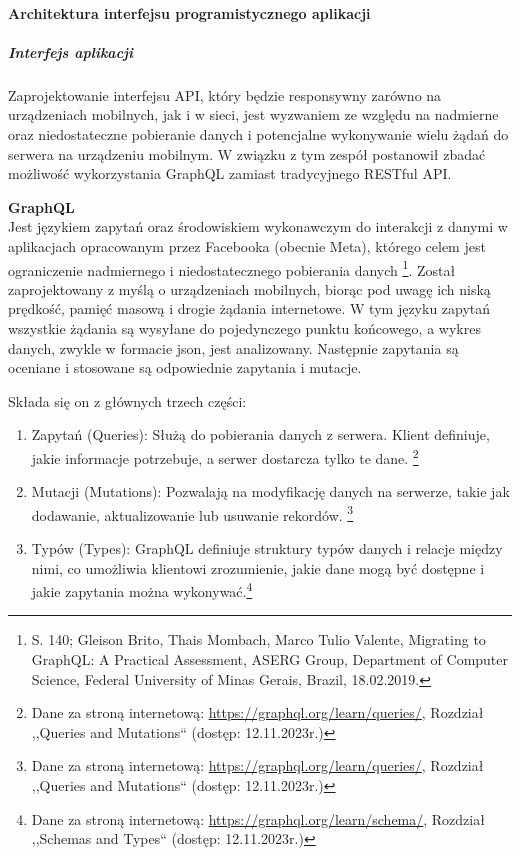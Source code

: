 \documentclass[12pt, a4paper, twoside, openany]{book}
\begin{document}
\paragraph{Architektura interfejsu programistycznego aplikacji}
\subparagraph{Interfejs aplikacji\\}
Zaprojektowanie interfejsu API, który będzie responsywny zarówno na urządzeniach mobilnych, jak i w sieci, jest wyzwaniem ze względu na nadmierne oraz niedostateczne pobieranie danych i potencjalne wykonywanie wielu żądań do serwera na urządzeniu mobilnym.
W związku z tym zespół postanowił zbadać możliwość wykorzystania GraphQL zamiast tradycyjnego RESTful API.

\textbf{GraphQL}\\
Jest językiem zapytań oraz środowiskiem wykonawczym do interakcji z danymi w aplikacjach opracowanym przez Facebooka (obecnie Meta), którego celem jest ograniczenie nadmiernego i niedostatecznego pobierania danych \footnote{S. 140; Gleison Brito, Thais Mombach, Marco Tulio Valente, Migrating to GraphQL: A Practical Assessment, ASERG Group, Department of Computer Science, Federal University of Minas Gerais, Brazil, 18.02.2019.}. Został zaprojektowany z myślą o urządzeniach mobilnych, biorąc pod uwagę ich niską prędkość, pamięć masową i drogie żądania internetowe.
W tym języku zapytań wszystkie żądania są wysyłane do pojedynczego punktu końcowego, a wykres danych, zwykle w formacie json, jest analizowany. Następnie zapytania są oceniane i stosowane są odpowiednie zapytania i mutacje.

Składa się on z głównych trzech części:
\begin{enumerate}
    \item Zapytań (Queries): Służą do pobierania danych z serwera. Klient definiuje, jakie informacje potrzebuje, a serwer dostarcza tylko te dane. \footnote{Dane za stroną internetową: \url{https://graphql.org/learn/queries/}, Rozdział ,,Queries and Mutations`` (dostęp: 12.11.2023r.)}
    \item Mutacji (Mutations): Pozwalają na modyfikację danych na serwerze, takie jak dodawanie, aktualizowanie lub usuwanie rekordów. \footnote{Dane za stroną internetową: \url{https://graphql.org/learn/queries/}, Rozdział ,,Queries and Mutations`` (dostęp: 12.11.2023r.)}
    \item Typów (Types): GraphQL definiuje struktury typów danych i relacje między nimi, co umożliwia klientowi zrozumienie, jakie dane mogą być dostępne i jakie zapytania można wykonywać.\footnote{Dane za stroną internetową: \url{https://graphql.org/learn/schema/}, Rozdział ,,Schemas and Types`` (dostęp: 12.11.2023r.)}
\end{enumerate}
\end{document}
